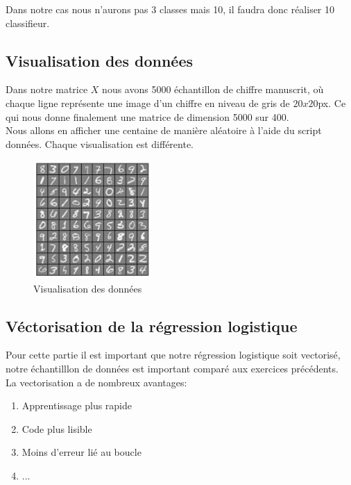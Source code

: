 \noindent
Dans notre cas nous n'aurons pas 3 classes mais 10, il faudra donc réaliser 10 classifieur.

\subsection{Visualisation des données}

Dans notre matrice $X$ nous avons 5000 échantillon de chiffre manuscrit, où chaque ligne représente une image d'un chiffre en niveau de gris de $20x20$px. Ce qui nous donne finalement une matrice de dimension 
5000 sur 400. \\
Nous allons en afficher une centaine de manière aléatoire à l'aide du script données. Chaque visualisation est différente.

\begin{figure}[!h]
    \begin{center}
        \includegraphics[width=0.4\textwidth]{./img/5.2.png}
        \caption{\label{fig:5.2}Visualisation des données}  
    \end{center}
\end{figure}

\clearpage
\subsection{Véctorisation de la régression logistique}

Pour cette partie il est important que notre régression logistique soit vectorisé, notre échantilllon de données est important comparé aux exercices précédents. \\
La vectorisation a de nombreux avantages:

\begin{enumerate}
    \item Apprentissage plus rapide
    \item Code plus lisible
    \item Moins d'erreur lié au boucle
    \item ...
\end{enumerate}

